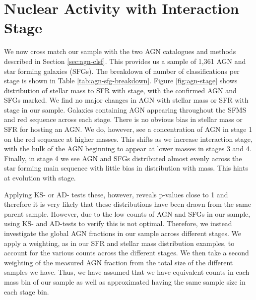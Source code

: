 \section{Nuclear Activity with Interaction Stage}\label{results:AGN_stage}
\noindent We now cross match our sample with the two AGN catalogues and methods described in Section \ref{sec:agn-clsf}. This provides us a sample of 1,361 AGN and star forming galaxies (SFGs). The breakdown of number of classifications per stage is shown in Table \ref{tab:agn-sfg-breakdown}. Figure \ref{fig:agn-stage} shows distribution of stellar mass to SFR with stage, with the confirmed AGN and SFGs marked. We find no major changes in AGN with stellar mass or SFR with stage in our sample. Galaxies containing AGN appearing throughout the SFMS and red sequence across each stage. There is no obvious bias in stellar mass or SFR for hosting an AGN. We do, however, see a concentration of AGN in stage 1 on the red sequence at higher masses. This shifts as we increase interaction stage, with the bulk of the AGN beginning to appear at lower masses in stages 3 and 4. Finally, in stage 4 we see AGN and SFGs distributed almost evenly across the star forming main sequence with little bias in distribution with mass. This hints at evolution with stage.

Applying KS- or AD- tests these, however, reveals p-values close to 1 and therefore it is very likely that these distributions have been drawn from the same parent sample. However, due to the low counts of AGN and SFGs in our sample, using KS- and AD-tests to verify this is not optimal. Therefore, we instead investigate the global AGN fractions in our sample across different stages. We apply a weighting, as in our SFR and stellar mass distribution examples, to account for the various counts across the different stages. We then take a second weighting of the measured AGN fraction from the total size of the different samples we have. Thus, we have assumed that we have equivalent counts in each mass bin of our sample as well as approximated having the same sample size in each stage bin.

